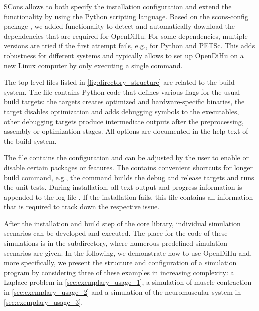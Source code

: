 SCons allows to both specify the installation configuration and extend the functionality by using the Python scripting language. Based on the scons-config package \cite{sconsconfig}, we added functionality to detect and automatically download the dependencies that are required for OpenDiHu. For some dependencies, multiple versions are tried if the first attempt fails, e.g., for Python and PETSc.
This adds robustness for different systems and typically allows to set up OpenDiHu on a new Linux computer by only executing a single  command.

The top-level files listed in \cref{fig:directory_structure} are related to the build system. The file  contains Python code that defines various flags for the usual build targets: the  targets creates optimized and hardware-specific binaries, the  target disables optimization and adds debugging symbols to the executables, other debugging targets produce intermediate outputs after the  preprocessing, assembly or optimization stages. All options are documented in the help text of the build system.

The  file contains the configuration and can be adjusted by the user to enable or disable certain packages or features. The  contains convenient shortcuts for longer build command, e.g., the command  builds the debug and release targets and runs the unit tests. During installation, all text output and progress information is appended to the log file . If the installation fails, this file contains all information that is required to track down the respective issue.

After the installation and build step of the core library, individual simulation scenarios can be developed and executed. The place for the code of these simulations is in the  subdirectory, where numerous predefined simulation scenarios are given. In the following, we demonstrate how to use OpenDiHu and, more specifically, we present the structure and configuration of a simulation program by considering three of these examples in increasing complexity: a Laplace problem in \cref{sec:exemplary_usage_1}, a simulation of muscle contraction in \cref{sec:exemplary_usage_2} and a simulation of the neuromuscular system in \cref{sec:exemplary_usage_3}.

